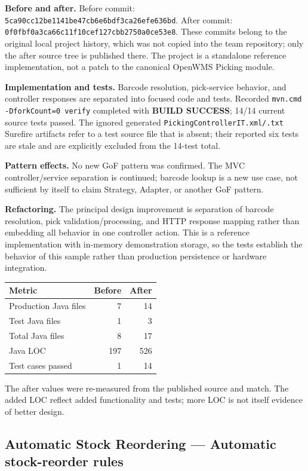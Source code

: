 \documentclass[11pt,a4paper]{article}
\newcommand{\code}[1]{\nolinkurl{#1}}
\begin{document}
\textbf{Before and after.} Before commit: \code{5ca90cc12be1141be47cb6e6bdf3ca26efe636bd}. After commit: \code{0f0fbf0a3ca66c11f10cef127cbb2750a0ce53e8}. These commits belong to the original local project history, which was not copied into the team repository; only the after source tree is published there. The project is a standalone reference implementation, not a patch to the canonical OpenWMS Picking module.

\textbf{Implementation and tests.} Barcode resolution, pick-service behavior, and controller responses are separated into focused code and tests. Recorded \code{mvn.cmd -DforkCount=0 verify} completed with \textbf{BUILD SUCCESS}; 14/14 current source tests passed. The ignored generated \code{PickingControllerIT.xml/.txt} Surefire artifacts refer to a test source file that is absent; their reported six tests are stale and are explicitly excluded from the 14-test total.

\textbf{Pattern effects.} No new GoF pattern was confirmed. The MVC controller/service separation is continued; barcode lookup is a new use case, not sufficient by itself to claim Strategy, Adapter, or another GoF pattern.

\textbf{Refactoring.} The principal design improvement is separation of barcode resolution, pick validation/processing, and HTTP response mapping rather than embedding all behavior in one controller action. This is a reference implementation with in-memory demonstration storage, so the tests establish the behavior of this sample rather than production persistence or hardware integration.


\begin{tabularx}{\linewidth}{@{}lrr@{}}
\toprule
Metric & Before & After\\
\midrule
Production Java files & 7 & 14\\
Test Java files & 1 & 3\\
Total Java files & 8 & 17\\
Java LOC & 197 & 526\\
Test cases passed & 1 & 14\\
\bottomrule
\end{tabularx}
The after values were re-measured from the published source and match. The added LOC reflect added functionality and tests; more LOC is not itself evidence of better design.

\subsection{\textbf{Automatic Stock Reordering} --- Automatic stock-reorder rules}
\end{document}
